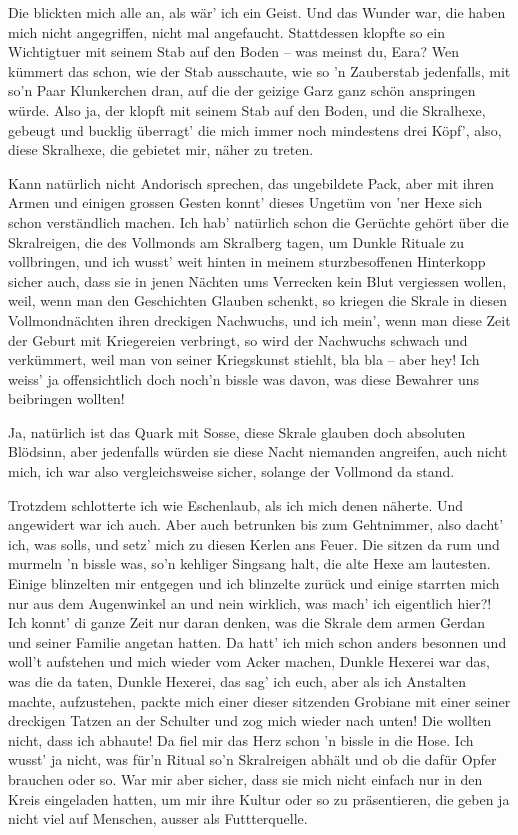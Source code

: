 Die blickten mich alle an, als wär’ ich ein Geist. Und das Wunder war, die haben mich nicht angegriffen, nicht mal angefaucht. Stattdessen klopfte so ein Wichtigtuer mit seinem Stab auf den Boden – was meinst du, Eara? Wen kümmert das schon, wie der Stab ausschaute, wie so 'n Zauberstab jedenfalls, mit so’n Paar Klunkerchen dran, auf die der geizige Garz ganz schön anspringen würde. Also ja, der klopft mit seinem Stab auf den Boden, und die Skralhexe, gebeugt und bucklig überragt’ die mich immer noch mindestens drei Köpf’, also, diese Skralhexe, die gebietet mir, näher zu treten.

Kann natürlich nicht Andorisch sprechen, das ungebildete Pack, aber mit ihren Armen und einigen grossen Gesten konnt’ dieses Ungetüm von ’ner Hexe sich schon verständlich machen. Ich hab’ natürlich schon die Gerüchte gehört über die Skralreigen, die des Vollmonds am Skralberg tagen, um Dunkle Rituale zu vollbringen, und ich wusst’ weit hinten in meinem sturzbesoffenen Hinterkopp sicher auch, dass sie in jenen Nächten ums Verrecken kein Blut vergiessen wollen, weil, wenn man den Geschichten Glauben schenkt, so kriegen die Skrale in diesen Vollmondnächten ihren dreckigen Nachwuchs, und ich mein’, wenn man diese Zeit der Geburt mit Kriegereien verbringt, so wird der Nachwuchs schwach und verkümmert, weil man von seiner Kriegskunst stiehlt, bla bla – aber hey! Ich weiss’ ja offensichtlich doch noch’n bissle was davon, was diese Bewahrer uns beibringen wollten!

Ja, natürlich ist das Quark mit Sosse, diese Skrale glauben doch absoluten Blödsinn, aber jedenfalls würden sie diese Nacht niemanden angreifen, auch nicht mich, ich war also vergleichsweise sicher, solange der Vollmond da stand.

Trotzdem schlotterte ich wie Eschenlaub, als ich mich denen näherte. Und angewidert war ich auch. Aber auch betrunken bis zum Gehtnimmer, also dacht’ ich, was solls, und setz’ mich zu diesen Kerlen ans Feuer. Die sitzen da rum und murmeln ’n bissle was, so’n kehliger Singsang halt, die alte Hexe am lautesten. Einige blinzelten mir entgegen und ich blinzelte zurück und einige starrten mich nur aus dem Augenwinkel an und nein wirklich, was mach’ ich eigentlich hier?! Ich konnt’ di ganze Zeit nur daran denken, was die Skrale dem armen Gerdan und seiner Familie angetan hatten. Da hatt’ ich mich schon anders besonnen und woll’t aufstehen und mich wieder vom Acker machen, Dunkle Hexerei war das, was die da taten, Dunkle Hexerei, das sag’ ich euch, aber als ich Anstalten machte, aufzustehen, packte mich einer dieser sitzenden Grobiane mit einer seiner dreckigen Tatzen an der Schulter und zog mich wieder nach unten! Die wollten nicht, dass ich abhaute! Da fiel mir das Herz schon ’n bissle in die Hose. Ich wusst’ ja nicht, was für’n Ritual so’n Skralreigen abhält und ob die dafür Opfer brauchen oder so. War mir aber sicher, dass sie mich nicht einfach nur in den Kreis eingeladen hatten, um mir ihre Kultur oder so zu präsentieren, die geben ja nicht viel auf Menschen, ausser als Futtterquelle.

